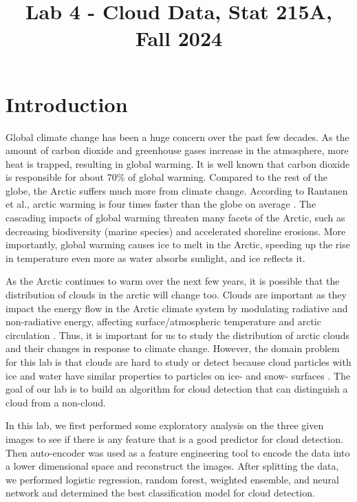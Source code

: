 \documentclass[11pt,letterpaper]{article}
\title{Lab 4 - Cloud Data, Stat 215A, Fall 2024\vspace{-2em}}
\begin{document}
\maketitle

\section{Introduction}
Global climate change has been a huge concern over the past few decades. As the amount of carbon dioxide and greenhouse gases increase in the atmosphere, more heat is trapped, resulting in global warming. It is well known that carbon dioxide is responsible for about 70\% of global warming. Compared to the rest of the globe, the Arctic suffers much more from climate change. According to Rantanen et al., arctic warming is four times faster than the globe on average \parencite{rantanen2022arctic}. The cascading impacts of global warming threaten many facets of the Arctic, such as decreasing biodiversity (marine species) and accelerated shoreline erosions. More importantly, global warming causes ice to melt in the Arctic, speeding up the rise in temperature even more as water absorbs sunlight, and ice reflects it.

As the Arctic continues to warm over the next few years, it is possible that the distribution of clouds in the arctic will change too. Clouds are important as they impact the energy flow in the Arctic climate system by modulating radiative and non-radiative energy, affecting surface/atmospheric temperature and arctic circulation \parencite{taylor2023isolating}. Thus, it is important for us to study the distribution of arctic clouds and their changes in response to climate change. However, the domain problem for this lab is that clouds are hard to study or detect because cloud particles with ice and water have similar properties to particles on ice- and snow- surfaces \parencite{shi2008daytime}. The goal of our lab is to build an algorithm for cloud detection that can distinguish a cloud from a non-cloud.

In this lab, we first performed some exploratory analysis on the three given images to see if there is any feature that is a good predictor for cloud detection. Then auto-encoder was used as a feature engineering tool to encode the data into a lower dimensional space and reconstruct the images. After splitting the data, we performed logistic regression, random forest, weighted ensemble, and neural network and determined the best classification model for cloud detection.
\end{document}
